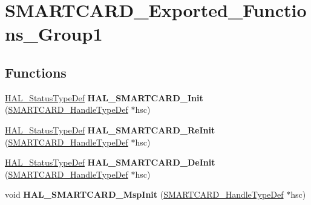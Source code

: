 \hypertarget{group___s_m_a_r_t_c_a_r_d___exported___functions___group1}{}\section{S\+M\+A\+R\+T\+C\+A\+R\+D\+\_\+\+Exported\+\_\+\+Functions\+\_\+\+Group1}
\label{group___s_m_a_r_t_c_a_r_d___exported___functions___group1}
\subsection*{Functions}
\begin{DoxyCompactItemize}
\item 
\hyperlink{stm32f4xx__hal__def_8h_a63c0679d1cb8b8c684fbb0632743478f}{H\+A\+L\+\_\+\+Status\+Type\+Def} {\bfseries H\+A\+L\+\_\+\+S\+M\+A\+R\+T\+C\+A\+R\+D\+\_\+\+Init} (\hyperlink{struct_s_m_a_r_t_c_a_r_d___handle_type_def}{S\+M\+A\+R\+T\+C\+A\+R\+D\+\_\+\+Handle\+Type\+Def} $\ast$hsc)\hypertarget{group___s_m_a_r_t_c_a_r_d___exported___functions___group1_ga95235c14cb192c26cf72bf44ddaaf551}{}\label{group___s_m_a_r_t_c_a_r_d___exported___functions___group1_ga95235c14cb192c26cf72bf44ddaaf551}

\item 
\hyperlink{stm32f4xx__hal__def_8h_a63c0679d1cb8b8c684fbb0632743478f}{H\+A\+L\+\_\+\+Status\+Type\+Def} {\bfseries H\+A\+L\+\_\+\+S\+M\+A\+R\+T\+C\+A\+R\+D\+\_\+\+Re\+Init} (\hyperlink{struct_s_m_a_r_t_c_a_r_d___handle_type_def}{S\+M\+A\+R\+T\+C\+A\+R\+D\+\_\+\+Handle\+Type\+Def} $\ast$hsc)\hypertarget{group___s_m_a_r_t_c_a_r_d___exported___functions___group1_ga1701fcf5d66117782a06569af1e40077}{}\label{group___s_m_a_r_t_c_a_r_d___exported___functions___group1_ga1701fcf5d66117782a06569af1e40077}

\item 
\hyperlink{stm32f4xx__hal__def_8h_a63c0679d1cb8b8c684fbb0632743478f}{H\+A\+L\+\_\+\+Status\+Type\+Def} {\bfseries H\+A\+L\+\_\+\+S\+M\+A\+R\+T\+C\+A\+R\+D\+\_\+\+De\+Init} (\hyperlink{struct_s_m_a_r_t_c_a_r_d___handle_type_def}{S\+M\+A\+R\+T\+C\+A\+R\+D\+\_\+\+Handle\+Type\+Def} $\ast$hsc)\hypertarget{group___s_m_a_r_t_c_a_r_d___exported___functions___group1_ga4b54b33c61b5284adbb7c98760425c2e}{}\label{group___s_m_a_r_t_c_a_r_d___exported___functions___group1_ga4b54b33c61b5284adbb7c98760425c2e}

\item 
void {\bfseries H\+A\+L\+\_\+\+S\+M\+A\+R\+T\+C\+A\+R\+D\+\_\+\+Msp\+Init} (\hyperlink{struct_s_m_a_r_t_c_a_r_d___handle_type_def}{S\+M\+A\+R\+T\+C\+A\+R\+D\+\_\+\+Handle\+Type\+Def} $\ast$hsc)\hypertarget{group___s_m_a_r_t_c_a_r_d___exported___functions___group1_ga13e9aae9f5dd3b332fc8e431596793dc}{}\label{group___s_m_a_r_t_c_a_r_d___exported___functions___group1_ga13e9aae9f5dd3b332fc8e431596793dc}


\end{DoxyCompactItemize}

